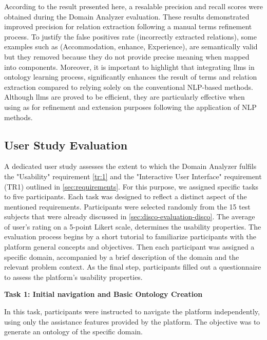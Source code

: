 According to the result presented here, a resalable precision and recall scores were obtained during the Domain Analyzer evaluation. These results demonstrated improved precision for relation extraction following a manual terms refinement process. To justify the false positives rate (incorrectly extracted relations), some examples such as (Accommodation, enhance, Experience), are semantically valid but they removed because they do not provide precise meaning when mapped into components. 
Moreover, it is important to highlight that integrating \gls{llm}s in ontology learning process, significantly enhances the result of terms and relation extraction compared to relying solely on the conventional NLP-based methods. Although \gls{llm}s are proved to be efficient, they are particularly effective when using as for refinement and extension purposes  following the application of NLP methods.



\vspace{-15pt}
\hypertarget{sec:onto.evaluation-user}{%
\subsection{User Study Evaluation}\label{sec:onto.evaluation-user}}
\vspace{10pt}

A dedicated user study assesses the extent to which the Domain Analyzer fulfils the "Usability" requirement \cref{tr:1} and the "Interactive User Interface" requirement (TR1) outlined in \cref{sec:requirements}. For this purpose, we assigned specific tasks to five participants. Each task was designed to reflect a distinct aspect of the mentioned requirements. Participants were selected randomly from the 15 test subjects that were already discussed in \cref{sec:disco-evaluation-disco}. The average of user’s rating  on a 5-point Likert scale, determines the usability properties.
The evaluation process begins by a short tutorial to familiarize participants with the platform general concepts and objectives. Then each participant was assigned a specific domain, accompanied by a brief description of the domain and the relevant problem context. As the final step, participants filled out a questionnaire to assess the platform's usability properties.

\textbf{Task 1: Initial navigation and Basic Ontology Creation}

In this task, participants were instructed to navigate the platform
independently, using only the assistance features provided by the
platform. The objective was to generate an ontology of the specific
domain.

